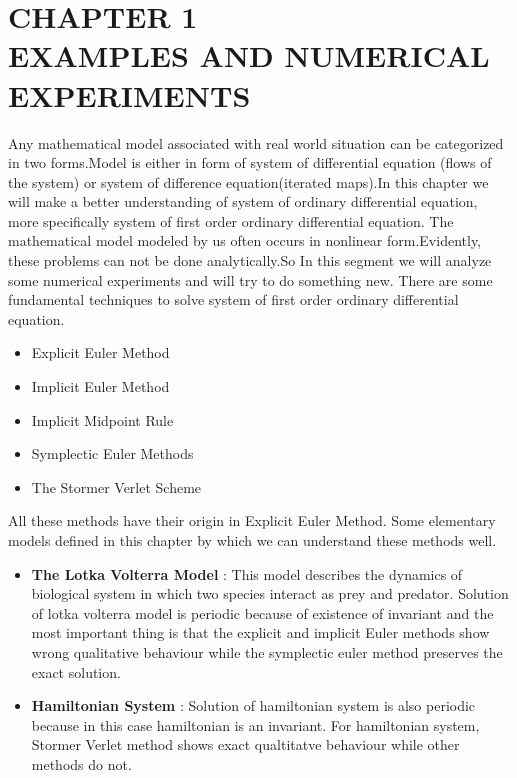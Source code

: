 \documentclass[PhD]{iitmdiss} %
\begin{document}
{\chapter{CHAPTER 1\\ EXAMPLES AND NUMERICAL EXPERIMENTS}
Any mathematical model associated with real world situation can be categorized in two forms.Model is either in form of system of differential equation (flows of the system) or system of difference equation(iterated maps).In this chapter we will make a better understanding of system of ordinary differential equation, more specifically system of first order ordinary differential equation. The mathematical model modeled by us often occurs in nonlinear form.Evidently, these problems can not be done analytically.So In this segment we will analyze some numerical experiments and will try to do something new.
There are some fundamental techniques to solve system of first order ordinary differential equation.\\
\begin{itemize}
    \item {Explicit Euler Method}\\
    \item {Implicit Euler Method}\\
    \item {Implicit Midpoint Rule}\\
    \item {Symplectic Euler Methods}\\
    \item {The Stormer Verlet Scheme}\\
\end{itemize}
All these methods have their origin in Explicit Euler Method. Some elementary models  defined in this chapter by which we can understand these methods well.
\begin{itemize}
    \item {\textbf{The Lotka Volterra Model} : This model describes the dynamics of biological system in which two species interact as prey and predator. Solution of lotka volterra model is periodic because of existence of invariant and the most important thing is that the explicit and implicit Euler methods show wrong qualitative behaviour while the symplectic euler method preserves the exact solution.}\\
    \item{\textbf{Hamiltonian System} : Solution of hamiltonian system is also periodic because in this case hamiltonian is an invariant. For hamiltonian system, Stormer Verlet method shows exact qualtitatve\cite{cCivril2008} behaviour while other methods do not.}\\
    

\end{itemize}}
\end{document}
